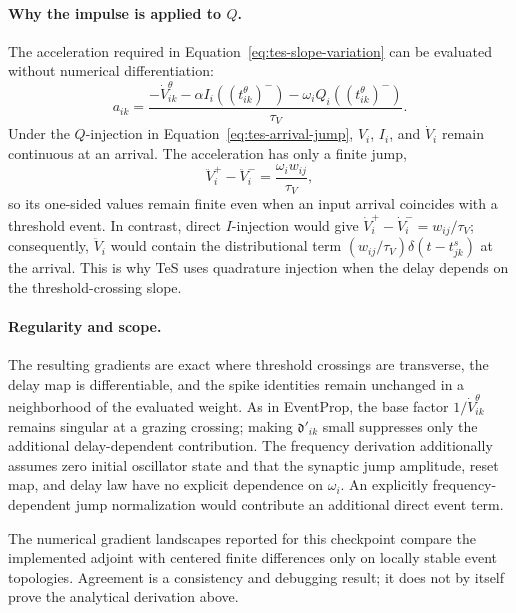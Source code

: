 \paragraph{Why the impulse is applied to $Q$.}
The acceleration required in Equation~\eqref{eq:tes-slope-variation} can be
evaluated without numerical differentiation:
\begin{equation}
    a_{ik}
      =\frac{-\dot V^\theta_{ik}
              -\alpha I_i((t^\theta_{ik})^-)
              -\omega_iQ_i((t^\theta_{ik})^-)}{\tau_V}.
    \label{eq:tes-acceleration}
\end{equation}
Under the $Q$-injection in Equation~\eqref{eq:tes-arrival-jump}, $V_i$, $I_i$,
and $\dot V_i$ remain continuous at an arrival. The acceleration has only a
finite jump,
\begin{equation}
    \ddot V_i^+-\ddot V_i^-
      =\frac{\omega_iw_{ij}}{\tau_V},
    \label{eq:tes-acceleration-jump}
\end{equation}
so its one-sided values remain finite even when an input arrival coincides
with a threshold event. In contrast, direct $I$-injection would give
$\dot V_i^+-\dot V_i^-=w_{ij}/\tau_V$; consequently, $\ddot V_i$ would contain
the distributional term
$(w_{ij}/\tau_V)\delta(t-t^s_{jk})$ at the arrival. This is why TeS uses
quadrature injection when the delay depends on the threshold-crossing slope.

\paragraph{Regularity and scope.}
The resulting gradients are exact
where threshold crossings are transverse, the delay map is differentiable,
and the spike identities remain unchanged in a neighborhood of the evaluated
weight. As in
EventProp, the base factor $1/\dot V^\theta_{ik}$ remains singular at a grazing
crossing; making $\mathfrak d'_{ik}$ small suppresses only the additional
delay-dependent contribution. The frequency derivation additionally assumes
zero initial oscillator state and that the synaptic jump amplitude, reset map,
and delay law have no explicit dependence on $\omega_i$. An explicitly
frequency-dependent jump normalization would contribute an additional direct
event term.

The numerical gradient landscapes reported for this checkpoint compare the
implemented adjoint with centered finite differences only on locally stable
event topologies.  Agreement is a consistency and debugging result; it does
not by itself prove the analytical derivation above.
